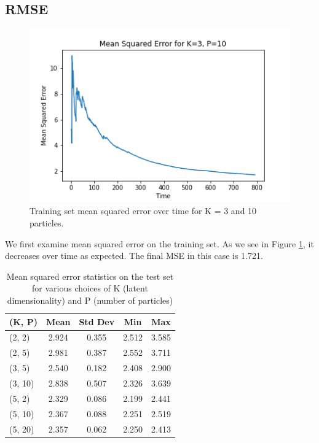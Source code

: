\documentclass{article}
\begin{document}
\subsection{RMSE}
\begin{figure}[ht]

\begin{center}
\centerline{\includegraphics[width=\columnwidth]{TrainMSE}}
\caption{Training set mean squared error over time for K = 3 and 10 particles.}
\label{TrainMSE}
\end{center}
\vskip -0.2in
\end{figure}

We first examine mean squared error on the training set. As we see in Figure \ref{TrainMSE}, it decreases
over time as expected. The final MSE in this case is 1.721.

\begin{table}[ht]
\caption{Mean squared error statistics on the test set for various choices of K
(latent dimensionality) and P (number of particles)}
\label{sample-table}
\vskip 0.15in
\begin{center}
\begin{small}
\begin{sc}
\begin{tabular}{lcccc}
\toprule
(K, P) & Mean & Std Dev & Min & Max \\
\midrule
(2, 2)  & 2.924 & 0.355 & 2.512 & 3.585 \\
(2, 5)  & 2.981 & 0.387 & 2.552 & 3.711 \\
(3, 5)  & 2.540 & 0.182 & 2.408 & 2.900 \\
(3, 10) & 2.838 & 0.507 & 2.326 & 3.639 \\
(5, 2)  & 2.329 & 0.086 & 2.199 & 2.441 \\
(5, 10) & 2.367 & 0.088 & 2.251 & 2.519 \\
(5, 20) & 2.357 & 0.062 & 2.250 & 2.413 \\
\bottomrule
\end{tabular}
\end{sc}
\end{small}
\end{center}
\vskip -0.1in
\end{table}
\end{document}
